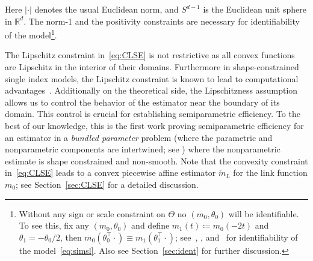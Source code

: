 \ee 
Here $| \cdot |$ denotes the usual Euclidean norm, and  $S^{d-1}$ is the Euclidean unit sphere in $\mathbb{R}^d$. The norm-1 and the positivity constraints are necessary for identifiability of the model\footnote{\label{foo:ident} Without any sign or scale constraint on $\Theta$ no $(m_0, \theta_0)$ will be identifiable. To see this, fix any $(m_0, \theta_0)$ and define $m_1(t) \coloneqq m_0(-2t)$ and $\theta_1 = -\theta_0/2$, then  $m_0(\theta_0^\top \cdot)\equiv m_1(\theta_1^\top \cdot)$; see~\cite{carroletal97}, \cite{cuietal11}, and~\cite{MR2369025} for identifiability of the model~\eqref{eq:simsl}. Also see Section~\ref{sec:ident} for further discussion.}. 

The Lipschitz constraint in~\eqref{eq:CLSE} is not restrictive as all convex functions are Lipschitz in the interior of their domains. Furthermore in shape-constrained single index models,  the Lipschitz constraint is known to  lead to computational advantages~\citep{kalai2009isotron,kakade2011efficient,lim2014convergence,ganti2015learning,mazumder2019computational}. 
{ Additionally on the theoretical side, the Lipschitzness assumption allows us to control the behavior of  the estimator near the boundary of its domain. This control is crucial for establishing semiparametric efficiency. To the best of our knowledge, this is the first work proving semiparametric efficiency for an estimator in a \textit{bundled parameter} problem (where the parametric and nonparametric components are intertwined; see \cite{huang1997interval}) where the nonparametric estimate is shape constrained and non-smooth.} %
Note that the convexity constraint in~\eqref{eq:CLSE} leads to a convex piecewise affine estimator $\check{m}_{L}$ for the link function $m_0$; see Section~\ref{sec:CLSE} for a detailed discussion. 




